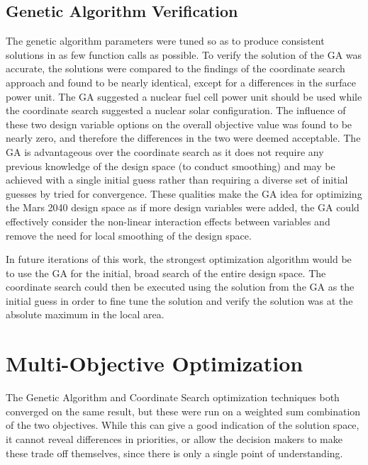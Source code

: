 \documentclass[]{aiaa-pretty}
\begin{document}
\subsection{Genetic Algorithm Verification}
The genetic algorithm parameters were tuned so as to produce consistent solutions in as few function calls as possible. To verify the solution of the GA was accurate, the solutions were compared to the findings of the coordinate search approach and found to be nearly identical, except for a differences in the surface power unit. The GA suggested a nuclear fuel cell power unit should be used while the coordinate search suggested a nuclear solar configuration. The influence of these two design variable options on the overall objective value was found to be nearly zero, and therefore the differences in the two were deemed acceptable. The GA is advantageous over the coordinate search as it does not require any previous knowledge of the design space (to conduct smoothing) and may be achieved with a single initial guess rather than requiring a diverse set of initial guesses by tried for convergence. These qualities make the GA idea for optimizing the Mars 2040 design space as if more design variables were added, the GA could effectively consider the non-linear interaction effects between variables and remove the need for local smoothing of the design space.

In future iterations of this work, the strongest optimization algorithm would be to use the GA for the initial, broad search of the entire design space. The coordinate search could then be executed using the solution from the GA as the initial guess in order to fine tune the solution and verify the solution was at the absolute maximum in the local area.




\section{Multi-Objective Optimization}
\label{sec:multi}
The Genetic Algorithm and Coordinate Search optimization techniques both converged on the same result, but these were run on a weighted sum combination of the two objectives. While this can give a good indication of the solution space, it cannot reveal differences in priorities, or allow the decision makers to make these trade off themselves, since there is only a single point of understanding.
\end{document}
